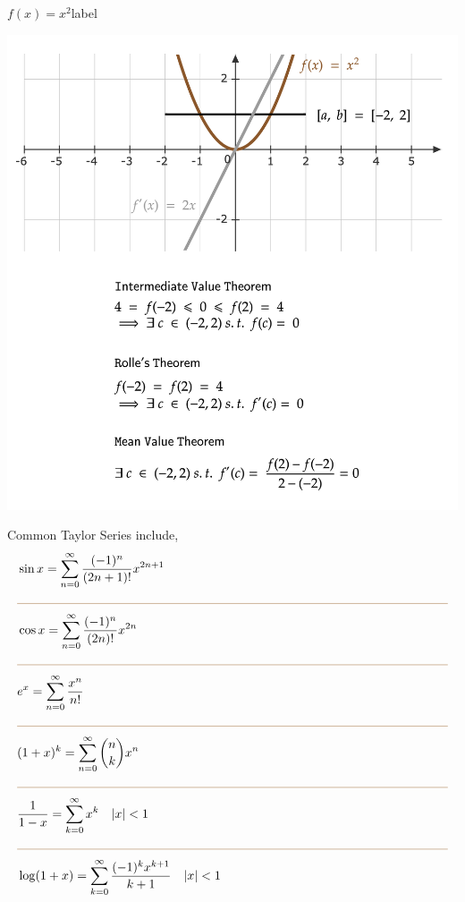 \begin{ex}{$f(x) = x^2$}{label}
    \begin{center}
       \includegraphics[width=\textwidth]{figures/fig-7b.png}
\end{center}
\end{ex}

\begin{marginfigure}
Common Taylor Series include,
\begin{align*}
    &\sin x=\sum_{n=0}^{\infty} \frac{(-1)^n}{(2 n+1) !} x^{2 n+1} \\
    &\LineBreak \\
    &\cos x=\sum_{n=0}^{\infty} \frac{(-1)^n}{(2 n) !} x^{2 n} \\
    &\LineBreak \\
    &e^x=\sum_{n=0}^{\infty} \frac{x^n}{n !} \\
    &\LineBreak \\
    &(1+x)^k=\sum_{n=0}^{\infty}\binom{n}{k} x^n \\
    &\LineBreak \\
    &\frac{1}{1-x}=\sum_{k=0}^{\infty} x^k \quad |x| < 1 \\
    &\LineBreak \\
    &\log (1+x)=\sum_{k=0}^{\infty} \frac{(-1)^k x^{k+1}}{k+1} \quad |x| < 1
\end{align*}
\end{marginfigure}

